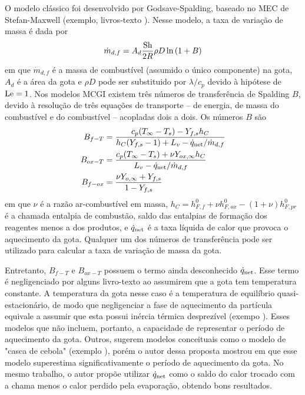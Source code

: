 O modelo clássico foi desenvolvido por Godsave-Spalding, baseado no MEC de Stefan-Maxwell (exemplo, livros-texto \cite{Glassman2008,Law2006,Turns2000}).
Nesse modelo, a taxa de variação de massa é dada por
\begin{equation}
    \dot m_{d,f} = A_d \frac{\mathrm{Sh}}{2R} \rho D \ln{(1 + B)} \label{eq:m_evap_B_M_2}
\end{equation}
em que $\dot m_{d,f}$ é a massa de combustível (assumido o único componente) na gota, $A_d$ é a área da gota e $\rho D$ pode ser substituido por $\lambda/c_p$ devido à hipótese de $\mathrm{Le}=1$.
Nos modelos MCGI existem três números de transferência de Spalding $B$, devido à resolução de três equações de transporte -- de energia, de massa do combustível e do combustível -- acopladas dois a dois.
Os números $B$ são
\begin{align}
    B_{f-T}  &= \frac{c_p(T_\infty - T_s) - Y_{f,s} h_C}{h_C(Y_{f,s} - 1) + L_v - \dot q_{\mathrm{net}}/\dot m_{d,f}} \label{eq:B_fq}\\
    B_{ox-T} &= \frac{c_p(T_\infty - T_s) + \nu Y_{ox,\infty}h_C}{L_v  - \dot q_{\mathrm{net}}/\dot m_{d,f}} \label{eq:B_oq}\\
    B_{f-ox} &= \frac{\nu Y_{o,\infty} + Y_{f,s}}{1 - Y_{f,s}} \label{eq:B_fo}
\end{align}
em que $\nu$ é a razão ar-combustível em massa, $h_C=h^0_{F,f} + \nu h^0_{F,ox} - (1+\nu)h^0_{F,pr}$ é a chamada entalpia de combustão, saldo das entalpias de formação dos reagentes menos a dos produtos, e $\dot q_{\mathrm{net}}$ é a taxa líquida de calor que provoca o aquecimento da gota.
Qualquer um dos números de transferência pode ser utilizado para calcular a taxa de variação de massa da gota.

Entretanto, $B_{f-T}$ e $B_{ox-T}$ possuem o termo ainda desconhecido $\dot q_{\mathrm{net}}$.
Esse termo é negligenciado por alguns livro-texto \cite{Glassman2008,Williams1985} ao assumirem que a gota tem temperatura constante. 
A temperatura da gota nesse caso é a temperatura de equilíbrio quasi-estacionário, de modo que negligenciar a fase de aquecimento da partícula equivale a assumir que esta possui inércia térmica desprezível (exempo \cite{Turns2000,Glassman2008}). 
Esses modelos que não incluem, portanto, a capacidade de representar o  período de aquecimento da gota.
Outros, sugerem modelos conceituais como o modelo de "casca de cebola" (exemplo \cite[p. 385]{Turns2000}), porém o autor dessa proposta mostrou em \cite{HenningsJ2024MT} que esse modelo superestima significativamente o período de aquecimento da gota.
No mesmo trabalho, o autor propõe utilizar $\dot q_{\mathrm{net}}$ como o saldo do calor trocado com a chama menos o calor perdido pela evaporação, obtendo bons resultados.

